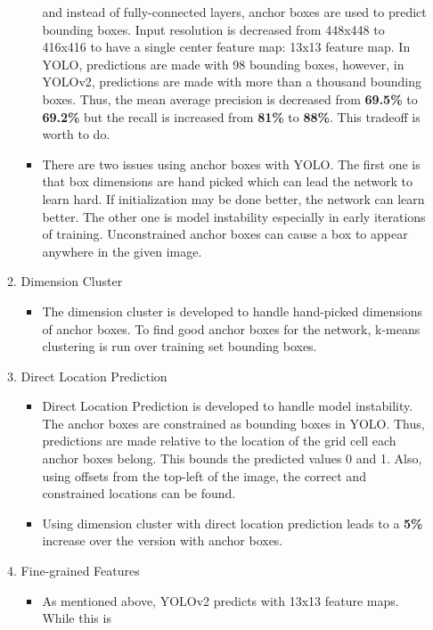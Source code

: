 \documentclass{article}
\begin{document}
\begin{enumerate}
\begin{enumerate}
\begin{itemize}
        and instead of fully-connected layers, anchor boxes are used to predict 
        bounding boxes. Input resolution is decreased from 448x448 to 416x416
        to have a single center feature map: 13x13 feature map. In YOLO, 
        predictions are made with 98 bounding boxes, however, in YOLOv2, 
        predictions are made with more than a thousand bounding boxes.
        Thus, the mean average precision is decreased from \textbf{69.5\%} to \textbf{69.2\%} but 
        the recall is increased from \textbf{81\%} to \textbf{88\%}. This tradeoff is worth to do.
            \item There are two issues using anchor boxes with YOLO. The first 
        one is that box dimensions are hand picked which can lead the network 
        to learn hard. If initialization may be done better, the network can learn 
        better. The other one is model instability especially in early iterations 
        of training. Unconstrained anchor boxes can cause a box to appear anywhere 
        in the given image.
        \end{itemize}
        \item Dimension Cluster
        \begin{itemize}
            \item The dimension cluster is developed to handle hand-picked dimensions
        of anchor boxes. To find good anchor boxes for the network, k-means clustering is run 
        over training set bounding boxes. 
        \end{itemize}
        \item Direct Location Prediction
        \begin{itemize}
            \item Direct Location Prediction is developed to handle model instability. 
        The anchor boxes are constrained as bounding boxes in YOLO. Thus, predictions 
        are made relative to the location of the grid cell each anchor boxes belong. This 
        bounds the predicted values 0 and 1. Also, using offsets from the top-left of the image, the 
        correct and constrained locations can be found. 
            \item Using dimension cluster with direct location prediction leads to a \textbf{5\%} increase 
        over the version with anchor boxes.
        \end{itemize}
        \item Fine-grained Features
        \begin{itemize}
            \item As mentioned above, YOLOv2 predicts with 13x13 feature maps. While this is 

\end{itemize}
\end{enumerate}
\end{enumerate}
\end{document}
